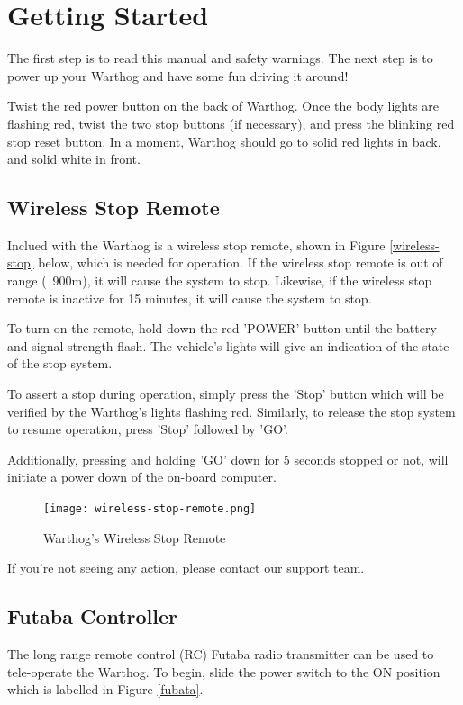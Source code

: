 \documentclass[]{clearpath-latex/clearpath-manual}
\begin{document}
\section{Getting Started}

The first step is to read this manual and safety warnings.  The next step is to power up your Warthog and have some fun driving it around!

Twist the red power button on the back of Warthog. Once the body lights are flashing red, twist the two stop buttons (if necessary), and press the blinking red stop reset button. In a moment, Warthog should go to solid red lights in back, and solid white in front.

\subsection{Wireless Stop Remote}

Inclued with the Warthog is a wireless stop remote, shown in Figure \autoref{wireless-stop} below, which is needed for operation.  If the wireless stop remote is out of range (~900m), it will cause the system to stop.
Likewise, if the wireless stop remote is inactive for 15 minutes, it will cause the system to stop.

To turn on the remote, hold down the red 'POWER' button until the battery and signal strength flash.
The vehicle's lights will give an indication of the state of the stop system.

To assert a stop during operation, simply press the 'Stop' button which will be verified by the Warthog's lights flashing red.  Similarly, to release the stop system to resume operation, press 'Stop' followed by 'GO'.

Additionally, pressing and holding 'GO' down for 5 seconds stopped or not, will initiate a power down of the on-board computer.

\begin{figure}[!h]
  \centering
  \texttt{[image: wireless-stop-remote.png]}
  \caption{Warthog's Wireless Stop Remote}
  \label{wireless-stop}
\end{figure}


If you’re not seeing any action, please contact our support team.

\subsection{Futaba Controller}

The long range remote control (RC) Futaba radio transmitter can be used to tele-operate the Warthog.
To begin, slide the power switch to the ON position which is labelled in Figure \autoref{fubata}.
\end{document}
